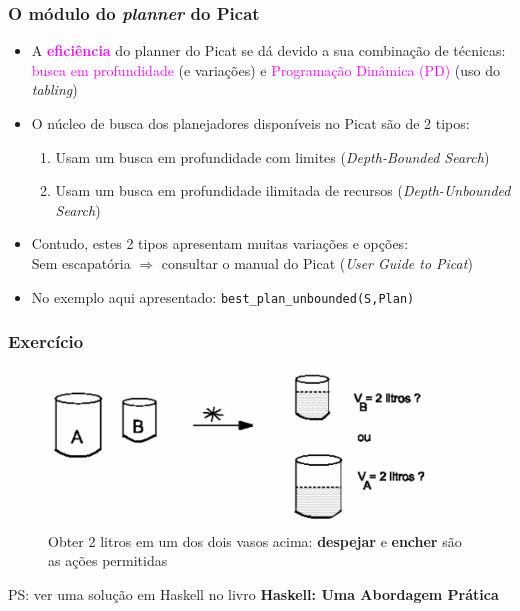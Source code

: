 \begin{frame}[fragile]
 \frametitle{O módulo do \textit{planner} do Picat}

\begin{itemize}

 \item A \textcolor{magenta}{\textbf{eficiência}} do planner do Picat se dá devido a sua combinação
       de técnicas: \textcolor{magenta}{busca em profundidade} (e variações) e \textcolor{magenta}{Programação
       Dinâmica (PD)} (uso do \textit{tabling})


  \pause 
  \item O núcleo de busca dos planejadores  disponíveis no Picat são de 2 tipos:
  \begin{enumerate}
    \item Usam um busca em profundidade com limites (\textit{Depth-Bounded Search})
    \item Usam um busca em profundidade ilimitada de recursos (\textit{Depth-Unbounded Search}) 
  \end{enumerate}
  
  \item Contudo, estes 2 tipos apresentam muitas variações e opções:\\
  \pause
  Sem escapatória $\Rightarrow $ consultar o manual do Picat (\textit{User Guide to Picat})
  
  \item No exemplo aqui apresentado: 
  \texttt{best\_plan\_unbounded(S,Plan)}   
\end{itemize}
\end{frame}



\begin{frame}
	\frametitle{Exercício}
	
	\begin{figure}[!htb]
		\centering
		\includegraphics[width=.8\textwidth, height=0.50\textheight]{figures/vasos2.pdf}
		\caption{Obter 2 litros em um dos dois vasos acima: \textbf{despejar} e  \textbf{encher} são as ações permitidas}
	\end{figure}

PS: ver uma solução em Haskell no livro \textbf{Haskell: Uma Abordagem Prática}

\end{frame}

